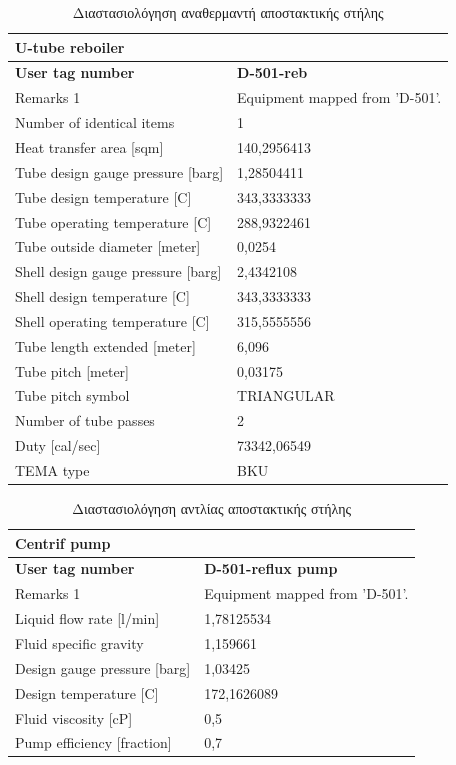 \documentclass[11pt]{article}
\begin{document}
\begin{table}[htbp]
\caption{Διαστασιολόγηση αναθερμαντή αποστακτικής στήλης}
\centering
\begin{tabular}{ll}
\textbf{U-tube reboiler} & \\
\hline
\textbf{User tag number} & \textbf{D-501-reb}\\
Remarks 1 & Equipment mapped from 'D-501'.\\
Number of identical items & 1\\
Heat transfer area [sqm] & 140,2956413\\
Tube design gauge pressure [barg] & 1,28504411\\
Tube design temperature [C] & 343,3333333\\
Tube operating temperature [C] & 288,9322461\\
Tube outside diameter [meter] & 0,0254\\
Shell design gauge pressure [barg] & 2,4342108\\
Shell design temperature [C] & 343,3333333\\
Shell operating temperature [C] & 315,5555556\\
Tube length extended [meter] & 6,096\\
Tube pitch [meter] & 0,03175\\
Tube pitch symbol & TRIANGULAR\\
Number of tube passes & 2\\
Duty [cal/sec] & 73342,06549\\
TEMA type & BKU\\
\end{tabular}
\end{table}


\begin{table}[htbp]
\caption{Διαστασιολόγηση αντλίας αποστακτικής στήλης}
\centering
\begin{tabular}{ll}
\textbf{Centrif pump} & \\
\hline
\textbf{User tag number} & \textbf{D-501-reflux pump}\\
Remarks 1 & Equipment mapped from 'D-501'.\\
Liquid flow rate [l/min] & 1,78125534\\
Fluid specific gravity & 1,159661\\
Design gauge pressure [barg] & 1,03425\\
Design temperature [C] & 172,1626089\\
Fluid viscosity [cP] & 0,5\\
Pump efficiency [fraction] & 0,7\\
\end{tabular}
\end{table}
\end{document}

